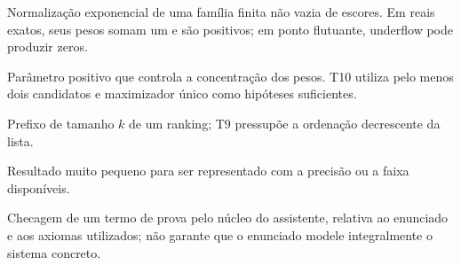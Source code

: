 \begin{description}[style=nextline,leftmargin=0pt,labelindent=0pt]
\item[Softmax.] Normalização exponencial de uma família finita não vazia de escores. Em reais exatos, seus pesos somam um e são positivos; em ponto flutuante, underflow pode produzir zeros.
\item[Temperatura.] Parâmetro positivo que controla a concentração dos pesos. T10 utiliza pelo menos dois candidatos e maximizador único como hipóteses suficientes.
\item[Top-\textit{k}.] Prefixo de tamanho $k$ de um ranking; T9 pressupõe a ordenação decrescente da lista.
\item[Underflow.] Resultado muito pequeno para ser representado com a precisão ou a faixa disponíveis.
\item[Verificação por máquina.] Checagem de um termo de prova pelo núcleo do assistente, relativa ao enunciado e aos axiomas utilizados; não garante que o enunciado modele integralmente o sistema concreto.
\end{description}
